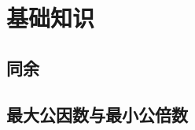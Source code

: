 
\section{基础知识}
\frame{}%
\subsection{同余}
\begin{frame}[c]
  \progressnow*
\end{frame}
\frame{}%
\subsection{最大公因数与最小公倍数}
\begin{frame}[c]
  \progressnow*
\end{frame}
\frame{}%
